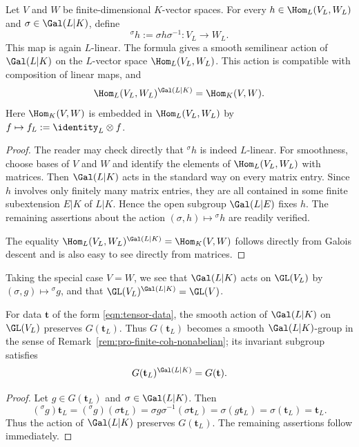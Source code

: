 \begin{lemma}
	Let $V$ and $W$ be finite-dimensional $K$-vector spaces. For every
	$h\in\Hom_L(V_L,W_L)$ and $\sigma\in\Gal(L|K)$, define
	\[
	{}^\sigma h:=\sigma h\sigma^{-1}:V_L\to W_L.
	\]
	This map is again $L$-linear. The formula gives a smooth semilinear action
	of $\Gal(L|K)$ on the $L$-vector space $\Hom_L(V_L,W_L)$. This action is
	compatible with composition of linear maps, and
	\[
	\Hom_L(V_L,W_L)^{\Gal(L|K)}=\Hom_K(V,W).
	\]
	Here $\Hom_K(V,W)$ is embedded in $\Hom_L(V_L,W_L)$ by
	$f\mapsto f_L:=\identity_L\otimes f$.
\end{lemma}
\begin{proof}
	The reader may check directly that ${}^\sigma h$ is indeed $L$-linear.
	For smoothness, choose bases of $V$ and $W$ and identify the elements of
	$\Hom_L(V_L,W_L)$ with matrices. Then $\Gal(L|K)$ acts in the standard way
	on every matrix entry. Since $h$ involves only finitely many matrix entries,
	they are all contained in some finite subextension $E|K$ of $L|K$. Hence the
	open subgroup $\Gal(L|E)$ fixes $h$. The remaining assertions about the
	action $(\sigma,h)\mapsto{}^\sigma h$ are readily verified.

	The equality
	$\Hom_L(V_L,W_L)^{\Gal(L|K)}=\Hom_K(V,W)$ follows directly from Galois
	descent and is also easy to see directly from matrices.
\end{proof}

Taking the special case $V=W$, we see that $\Gal(L|K)$ acts on $\GL(V_L)$
by $(\sigma,g)\mapsto{}^\sigma g$, and that
$\GL(V_L)^{\Gal(L|K)}=\GL(V)$.

\begin{lemma}
	For data $\mathbf{t}$ of the form \eqref{eqn:tensor-data}, the smooth action
	of $\Gal(L|K)$ on $\GL(V_L)$ preserves $G(\mathbf{t}_L)$. Thus
	$G(\mathbf{t}_L)$ becomes a smooth $\Gal(L|K)$-group in the sense of
	Remark~\ref{rem:pro-finite-coh-nonabelian}; its invariant subgroup satisfies
	\[
	G(\mathbf{t}_L)^{\Gal(L|K)}=G(\mathbf{t}).
	\]
\end{lemma}
\begin{proof}
	Let $g\in G(\mathbf{t}_L)$ and $\sigma\in\Gal(L|K)$. Then
	\[
	({}^\sigma g)\mathbf{t}_L
	=({}^\sigma g)(\sigma\mathbf{t}_L)
	=\sigma g\sigma^{-1}(\sigma\mathbf{t}_L)
	=\sigma(g\mathbf{t}_L)
	=\sigma(\mathbf{t}_L)
	=\mathbf{t}_L.
	\]
	Thus the action of $\Gal(L|K)$ preserves $G(\mathbf{t}_L)$. The remaining
	assertions follow immediately.
\end{proof}

